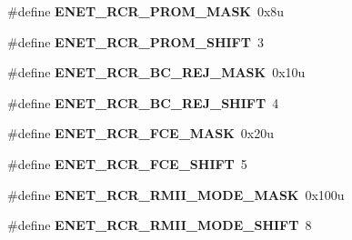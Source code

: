 \begin{DoxyCompactItemize}
\item 
\hypertarget{group___e_n_e_t___register___masks_gac7ad0640855d497207c29e8558341616}{}\#define {\bfseries E\+N\+E\+T\+\_\+\+R\+C\+R\+\_\+\+P\+R\+O\+M\+\_\+\+M\+A\+S\+K}~0x8u\label{group___e_n_e_t___register___masks_gac7ad0640855d497207c29e8558341616}

\item 
\hypertarget{group___e_n_e_t___register___masks_gabd47b61ac9aecad49dd266ff3421b98f}{}\#define {\bfseries E\+N\+E\+T\+\_\+\+R\+C\+R\+\_\+\+P\+R\+O\+M\+\_\+\+S\+H\+I\+F\+T}~3\label{group___e_n_e_t___register___masks_gabd47b61ac9aecad49dd266ff3421b98f}

\item 
\hypertarget{group___e_n_e_t___register___masks_gaf7ca1d57cd7888b1cb6e0d6834eeba06}{}\#define {\bfseries E\+N\+E\+T\+\_\+\+R\+C\+R\+\_\+\+B\+C\+\_\+\+R\+E\+J\+\_\+\+M\+A\+S\+K}~0x10u\label{group___e_n_e_t___register___masks_gaf7ca1d57cd7888b1cb6e0d6834eeba06}

\item 
\hypertarget{group___e_n_e_t___register___masks_gafbd6d9ebd1bfe9b4271864e5148765ba}{}\#define {\bfseries E\+N\+E\+T\+\_\+\+R\+C\+R\+\_\+\+B\+C\+\_\+\+R\+E\+J\+\_\+\+S\+H\+I\+F\+T}~4\label{group___e_n_e_t___register___masks_gafbd6d9ebd1bfe9b4271864e5148765ba}

\item 
\hypertarget{group___e_n_e_t___register___masks_ga6e58a40675d508a7590ae8bb7839c415}{}\#define {\bfseries E\+N\+E\+T\+\_\+\+R\+C\+R\+\_\+\+F\+C\+E\+\_\+\+M\+A\+S\+K}~0x20u\label{group___e_n_e_t___register___masks_ga6e58a40675d508a7590ae8bb7839c415}

\item 
\hypertarget{group___e_n_e_t___register___masks_ga6e69724dd9dc3b78523a31f53a661f4f}{}\#define {\bfseries E\+N\+E\+T\+\_\+\+R\+C\+R\+\_\+\+F\+C\+E\+\_\+\+S\+H\+I\+F\+T}~5\label{group___e_n_e_t___register___masks_ga6e69724dd9dc3b78523a31f53a661f4f}

\item 
\hypertarget{group___e_n_e_t___register___masks_ga9064baf1508e639692ce75025526d32f}{}\#define {\bfseries E\+N\+E\+T\+\_\+\+R\+C\+R\+\_\+\+R\+M\+I\+I\+\_\+\+M\+O\+D\+E\+\_\+\+M\+A\+S\+K}~0x100u\label{group___e_n_e_t___register___masks_ga9064baf1508e639692ce75025526d32f}

\item 
\hypertarget{group___e_n_e_t___register___masks_ga9920faf83d3b2ac7afe335d818119e14}{}\#define {\bfseries E\+N\+E\+T\+\_\+\+R\+C\+R\+\_\+\+R\+M\+I\+I\+\_\+\+M\+O\+D\+E\+\_\+\+S\+H\+I\+F\+T}~8\label{group___e_n_e_t___register___masks_ga9920faf83d3b2ac7afe335d818119e14}


\end{DoxyCompactItemize}
